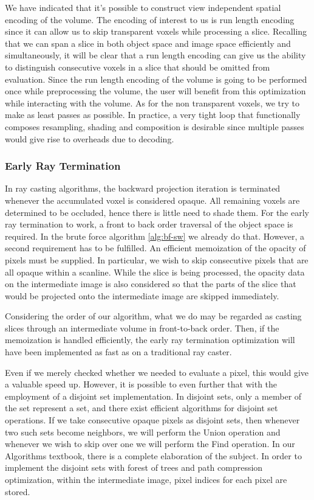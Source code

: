\documentclass[a4paper,12pt]{article}
\begin{document}
We have indicated that it's possible to construct view independent
spatial encoding of the volume. The encoding of interest to us is run
length encoding since it can allow us to skip transparent voxels while
processing a slice. Recalling that we can span a slice in both object
space and image space efficiently and simultaneously,
it will be clear that a run length encoding can give us the ability 
to distinguish consecutive voxels in a slice that should be omitted
from evaluation. Since the run length encoding of the volume is going
to be performed once while preprocessing the volume, the user will
benefit from this optimization while interacting with the volume. As
for the non transparent voxels, we try to make as least passes as
possible. In practice, a very tight loop that functionally composes
resampling, shading and composition is desirable since multiple passes
would give rise to overheads due to decoding.


\subsubsection{Early Ray Termination}
In ray casting algorithms, the backward projection iteration is
terminated whenever the accumulated voxel is considered opaque. All
remaining voxels are determined to be occluded, hence there is little need
to shade them. For the early ray termination to work, a front to back
order traversal of the object space is required. In the brute force
algorithm \ref{alg:bf-sw} we already do that. However, a second
requirement has to be fulfilled. An efficient memoization of the
opacity of pixels must be supplied. In particular, we wish to skip
consecutive pixels that are all opaque within a scanline. 
 While the slice is being processed, the opacity data
on the intermediate image is also considered so that the parts of the
slice that would be projected onto the intermediate image are skipped
immediately.

Considering the order of our algorithm, what we do may be regarded as
casting slices through an intermediate volume in front-to-back
order. Then, if the memoization is handled efficiently, the early ray
termination optimization will have been implemented as fast as on a
traditional ray caster.

Even if we merely checked whether we needed to evaluate a pixel, this
would give a valuable speed up. However, it is possible to even
further that with the employment of a disjoint set implementation. In
disjoint sets, only a member of the set represent a set, and there
exist efficient algorithms for disjoint set operations. If we take
consecutive opaque pixels as disjoint sets, then whenever two such
sets become neighbors, we will perform the Union operation and
whenever we wish to skip over one we will perform the Find
operation. In our Algorithms textbook, there is a complete elaboration
of the subject. In order to implement the disjoint sets with forest of
trees and path compression optimization, within the intermediate
image, pixel indices for each pixel are stored.
\end{document}
